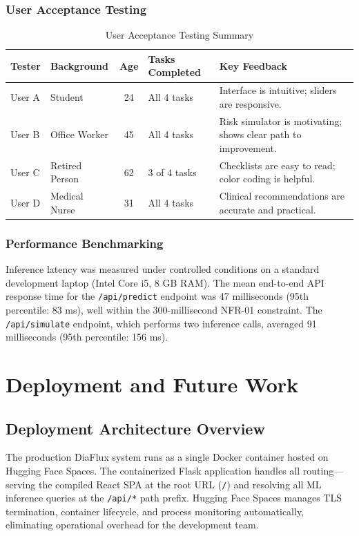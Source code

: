 \documentclass[12pt,a4paper]{report}
\begin{document}
\subsection{User Acceptance Testing}
\begin{table}[H]
\centering
\caption{User Acceptance Testing Summary}
\label{tab:ui_testing}
\begin{tabular}{llcll}
\toprule
\textbf{Tester} & \textbf{Background} & \textbf{Age} & \textbf{Tasks Completed} & \textbf{Key Feedback} \\
\midrule
User A & Student        & 24 & All 4 tasks & Interface is intuitive; sliders are responsive. \\
User B & Office Worker  & 45 & All 4 tasks & Risk simulator is motivating; shows clear path to improvement. \\
User C & Retired Person & 62 & 3 of 4 tasks & Checklists are easy to read; color coding is helpful. \\
User D & Medical Nurse  & 31 & All 4 tasks & Clinical recommendations are accurate and practical. \\
\bottomrule
\end{tabular}
\end{table}

\subsection{Performance Benchmarking}
Inference latency was measured under controlled conditions on a standard development laptop (Intel Core i5, 8 GB RAM). The mean end-to-end API response time for the \texttt{/api/predict} endpoint was 47 milliseconds (95th percentile: 83 ms), well within the 300-millisecond NFR-01 constraint. The \texttt{/api/simulate} endpoint, which performs two inference calls, averaged 91 milliseconds (95th percentile: 156 ms).

\clearpage

\chapter{Deployment and Future Work}

\section{Deployment Architecture Overview}
The production DiaFlux system runs as a single Docker container hosted on Hugging Face Spaces. The containerized Flask application handles all routing---serving the compiled React SPA at the root URL (\texttt{/}) and resolving all ML inference queries at the \texttt{/api/*} path prefix. Hugging Face Spaces manages TLS termination, container lifecycle, and process monitoring automatically, eliminating operational overhead for the development team.
\end{document}
